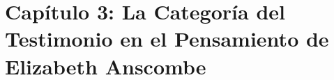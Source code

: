 \documentclass[../main.tex]{subfiles}
\begin{document}
\chapter*{Capítulo 3: La Categoría del Testimonio en el Pensamiento de Elizabeth Anscombe}








\end{document}
